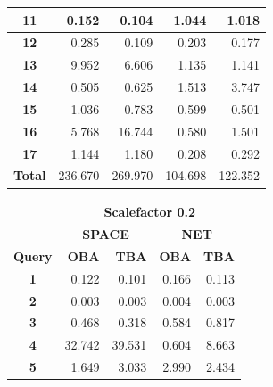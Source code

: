 \documentclass[a4paper]{article}
\begin{document}
\begin{figure}[h]
\begin{minipage}{0.5\linewidth}
\begin{tiny}
\begin{tabular}{|c|r|r|r|r|}
        \hline
        \textbf{11}    &   0.152      &   0.104      &   1.044      &   1.018\\
        \hline
        \textbf{12}    &   0.285      &   0.109      &   0.203      &   0.177\\
        \hline
        \textbf{13}    &   9.952      &   6.606      &   1.135      &   1.141\\
        \hline
        \textbf{14}    &   0.505      &   0.625      &   1.513      &   3.747\\
        \hline
        \textbf{15}    &   1.036      &   0.783      &   0.599      &   0.501\\
        \hline
        \textbf{16}    &   5.768      &  16.744      &   0.580      &   1.501\\
        \hline
        \textbf{17}    &   1.144      &   1.180      &   0.208      &   0.292\\
        \hline
        \textbf{Total} & 236.670      & 269.970      & 104.698      & 122.352\\
        \hline
      \end{tabular}
    \end{tiny}
  \end{minipage} \hfill
  \begin{minipage}{0.5\linewidth}
    \begin{tiny}
      \begin{tabular}{|c|r|r|r|r|}
        \hline
                       & \multicolumn{4}{c|}{\textbf{Scalefactor 0.2}}\\
        \cline{2-5}
                       & \multicolumn{2}{c|}{\textbf{SPACE}} & \multicolumn{2}{c|}{\textbf{NET}}\\
        \hline
        \textbf{Query} & \textbf{OBA} & \textbf{TBA}  & \textbf{OBA} & \textbf{TBA}\\
        \hline
        \textbf{1}     &    0.122     &    0.101      &    0.166     &    0.113\\
        \hline
        \textbf{2}     &    0.003     &    0.003      &    0.004     &    0.003\\
        \hline
        \textbf{3}     &    0.468     &    0.318      &    0.584     &    0.817\\
        \hline
        \textbf{4}     &   32.742     &   39.531      &    0.604     &    8.663\\
        \hline
        \textbf{5}     &    1.649     &    3.033      &    2.990     &    2.434\\
        \hline

\end{tabular}
\end{tiny}
\end{minipage}
\end{figure}
\end{document}
